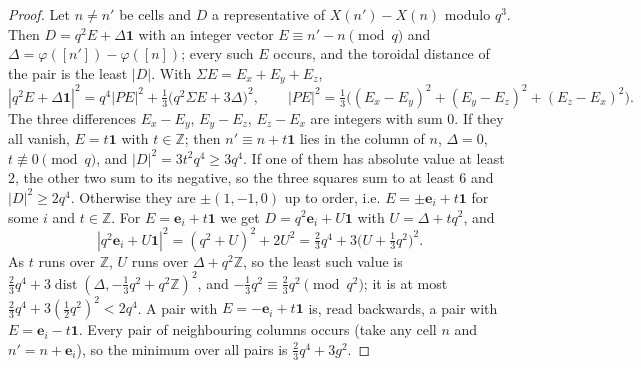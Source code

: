\documentclass[11pt]{amsart}
\theoremstyle{definition}
\theoremstyle{plain}
\newcommand{\Z}{\mathbb{Z}}
\newcommand{\e}{\mathbf{e}}
\begin{document}
\begin{proof}
Let $n\ne n'$ be cells and $D$ a representative of $X(n')-X(n)$ modulo $q^3$. Then $D=q^2E+\Delta\mathbf 1$ with an integer vector $E\equiv n'-n\pmod q$ and $\Delta=\varphi([n'])-\varphi([n])$; every such $E$ occurs, and the toroidal distance of the pair is the least $|D|$. With $\Sigma E=E_x+E_y+E_z$,
\[
|q^2E+\Delta\mathbf 1|^2=q^4|PE|^2+\tfrac13\bigl(q^2\Sigma E+3\Delta\bigr)^2,\qquad
|PE|^2=\tfrac13\bigl((E_x-E_y)^2+(E_y-E_z)^2+(E_z-E_x)^2\bigr).
\]
The three differences $E_x-E_y$, $E_y-E_z$, $E_z-E_x$ are integers with sum $0$. If they all vanish, $E=t\mathbf 1$ with $t\in\Z$; then $n'\equiv n+t\mathbf 1$ lies in the column of $n$, $\Delta=0$, $t\not\equiv0\pmod q$, and $|D|^2=3t^2q^4\ge3q^4$. If one of them has absolute value at least $2$, the other two sum to its negative, so the three squares sum to at least $6$ and $|D|^2\ge2q^4$. Otherwise they are $\pm(1,-1,0)$ up to order, i.e. $E=\pm\e_i+t\mathbf 1$ for some $i$ and $t\in\Z$. For $E=\e_i+t\mathbf 1$ we get $D=q^2\e_i+U\mathbf 1$ with $U=\Delta+tq^2$, and
\[
|q^2\e_i+U\mathbf 1|^2=(q^2+U)^2+2U^2=\tfrac23q^4+3\bigl(U+\tfrac13q^2\bigr)^2 .
\]
As $t$ runs over $\Z$, $U$ runs over $\Delta+q^2\Z$, so the least such value is $\frac23q^4+3\operatorname{dist}(\Delta,-\frac13q^2+q^2\Z)^2$, and $-\frac13q^2\equiv\frac23q^2\pmod{q^2}$; it is at most $\frac23q^4+3(\frac12q^2)^2<2q^4$. A pair with $E=-\e_i+t\mathbf 1$ is, read backwards, a pair with $E=\e_i-t\mathbf 1$. Every pair of neighbouring columns occurs (take any cell $n$ and $n'=n+\e_i$), so the minimum over all pairs is $\frac23q^4+3g^2$.
\end{proof}
\end{document}

